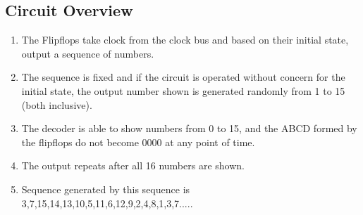 \documentclass{article}
\begin{document}
\subsection{Circuit Overview}
\begin{enumerate}
\item The Flipflops take clock from the clock bus and based on their initial state, output a sequence of numbers.
\item The sequence is fixed and if the circuit is operated without concern for the initial state, the output number shown is generated randomly from 1 to 15 (both inclusive).
\item The decoder is able to show numbers from 0 to 15, and the ABCD formed by the flipflops do not become 0000 at any point of time.
\item The output repeats after all 16 numbers are shown.
 
\item Sequence generated by this sequence is 3,7,15,14,13,10,5,11,6,12,9,2,4,8,1,3,7.....
\end{enumerate}
\end{document}
